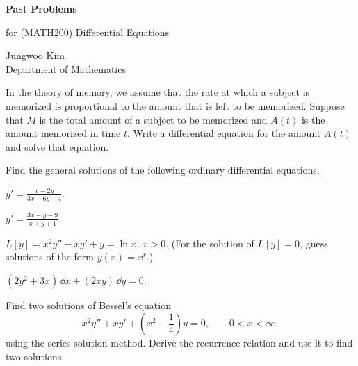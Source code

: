 \documentclass[11pt,oneside]{article}
\begin{document}
\thispagestyle{empty}

\begin{center}
    \vspace*{1.1cm}
    {\LARGE\bfseries Past Problems\par}
    \vspace{0.25cm}
    {\large for (MATH200) Differential Equations\par}
    \vspace{0.75cm}
    {\normalsize
    Jungwoo Kim\\
    Department of Mathematics\\
    \PohangUniversityOfScienceAndTechnology
    \par}
\end{center}

\vspace{0.8cm}

\schoolsection{\POSTECH}{\PohangUniversityOfScienceAndTechnology}

\begin{problem}
In the theory of memory, we assume that the rate at which a subject is memorized is proportional to the amount that is left to be memorized. Suppose that $M$ is the total amount of a subject to be memorized and $A(t)$ is the amount memorized in time $t$. Write a differential equation for the amount $A(t)$ and solve that equation.
\end{problem}

\begin{problem}
Find the general solutions of the following ordinary differential equations.
\begin{problemsubparts}
\item $\displaystyle y'=\frac{x-2y}{3x-6y+4}$.
\item $\displaystyle y'=\frac{3x-y-9}{x+y+1}$.
\item $L[y]=x^2y''-xy'+y=\ln x$, $x>0$. (For the solution of $L[y]=0$, guess solutions of the form $y(x)=x^r$.)
\item $\displaystyle (2y^2+3x)\,\dd x+(2xy)\,\dd y=0$.
\end{problemsubparts}
\end{problem}

\begin{problem}
Find two solutions of Bessel's equation
\[
x^2y''+xy'+\left(x^2-\frac14\right)y=0,\qquad 0<x<\infty,
\]
using the series solution method. Derive the recurrence relation and use it to find two solutions.
\end{problem}
\end{document}
